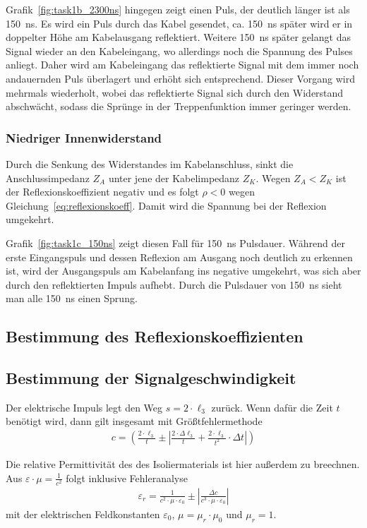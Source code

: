 \documentclass{article}
\begin{document}
Grafik~\ref{fig:task1b_2300ns} hingegen zeigt einen Puls, der deutlich länger ist als 150~ns. Es wird ein Puls durch das Kabel gesendet, ca. 150~ns später wird er in doppelter Höhe am Kabelausgang reflektiert. Weitere 150~ns später gelangt das Signal wieder an den Kabeleingang, wo allerdings noch die Spannung des Pulses anliegt. Daher wird am Kabeleingang das reflektierte Signal mit dem immer noch andauernden Puls überlagert und erhöht sich entsprechend. Dieser Vorgang wird mehrmals wiederholt, wobei das reflektierte Signal sich durch den Widerstand abschwächt, sodass die Sprünge in der Treppenfunktion immer geringer werden. 


\subsubsection{Niedriger Innenwiderstand}

Durch die Senkung des Widerstandes im Kabelanschluss, sinkt die Anschlussimpedanz $Z_A$ unter jene der Kabelimpedanz $Z_K$. Wegen $Z_A < Z_K$ ist der Reflexionskoeffizient negativ und es folgt $\rho < 0$ wegen Gleichung~\eqref{eq:reflexionskoeff}. Damit wird die Spannung bei der Reflexion umgekehrt.

Grafik~\ref{fig:task1c_150ns} zeigt diesen Fall für 150~ns Pulsdauer. Während der erste Eingangspuls und dessen Reflexion am Ausgang noch deutlich zu erkennen ist, wird der Ausgangspuls am Kabelanfang ins negative umgekehrt, was sich aber durch den reflektierten Impuls aufhebt. Durch die Pulsdauer von 150~ns sieht man alle 150~ns einen Sprung.

\subsection{Bestimmung des Reflexionskoeffizienten}

\subsection{Bestimmung der Signalgeschwindigkeit}

Der elektrische Impuls legt den Weg $s = 2\cdot \ell_3$ zurück. Wenn dafür die Zeit $t$ benötigt wird, dann gilt insgesamt mit Größtfehlermethode
\begin{align*}
c = \left(\frac{2\cdot \ell_3}{t} \pm \left|\frac{2\cdot \Delta \ell_3}{t} + \frac{2\cdot \ell_3}{t^2}\cdot \Delta t\right|\right)
\end{align*}

Die relative Permittivität des des Isoliermaterials ist hier außerdem zu breechnen. Aus $\varepsilon \cdot \mu = \frac{1}{c^2}$ folgt inklusive Fehleranalyse
\begin{align*}
\varepsilon_r = \frac{1}{c^2\cdot \mu\cdot \varepsilon_0} \pm \left| \frac{\Delta c}{c^3\cdot \mu\cdot \varepsilon_0} \right|
\end{align*}
mit der elektrischen Feldkonstanten $\varepsilon_0$, $\mu = \mu_r\cdot\mu_0$ und $\mu_r=1$.
\end{document}
